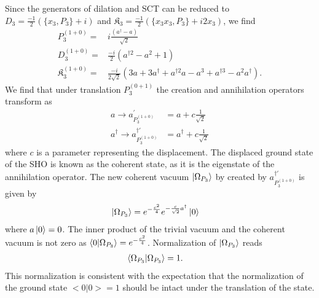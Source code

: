 \documentclass[%
 reprint,
superscriptaddress,
 amsmath,amssymb,
 aps,
]{revtex4-2}
\begin{document}
Since the generators of dilation and SCT can be reduced to $D_{3}=\frac{-1}{2}\left(\{x_{3}, P_{3}\}+i\right)$ and $\mathfrak{K}_{{3}}=\frac{-1}{2}\left(\{x_{3}x_{3}, P_{3}\}+i2x_{3}\right)$, we find
\begin{align}
    P^{(1+0)}_{3}=&i\frac{(a^{\dagger}-a)}{\sqrt{2}}\label{creation_anni_P}\\
    D^{(1+0)}_{3}=&\frac{-i}{2}\left(a^{\dagger 2} - a^2+1\right)\label{creation_anni_D}\\
    \mathfrak{K}^{(1+0)}_{{3}}=&\frac{-i}{2\sqrt{2}}\left(3a+3a^{\dagger}+  a^{\dagger 2}a - a^3 +  a^{\dagger 3} - a^2 a^{\dagger}\right)\label{creation_anni_KK}.
\end{align}
We find that under translation $P^{(0+1)}_{3}$ the creation and annihilation operators transform as
\begin{align}
    a \rightarrow a^{\prime}_{P^{(1+0)}_{3}}&=a +c \frac{1}{\sqrt{2}}\\
    a^{\dagger} \rightarrow a^{\dagger\prime}_{P^{(1+0)}_{3}}&=a^{\dagger} +c \frac{1}{\sqrt{2}}
\end{align}
where $c$ is a parameter representing the displacement. The displaced ground state of the SHO is known as the coherent state, as it is the eigenstate of the annihilation operator\cite{Glauber1963}. The new coherent vacuum $\ket{\Omega_{P_{3}}}$ by created by $a^{\dagger\prime}_{P^{(1+0)}_{3}}$ is given by
\begin{align}
    \ket{\Omega_{P_{3}}}&=e^{-\frac{c^2}{4}}e^{-\frac{c}{\sqrt{2}}a^{\dagger}}\ket{0}
\end{align}
where $a\ket{0}=0$. The inner product of the trivial vacuum and the coherent vacuum is not zero as $\braket{0|\Omega_{P_{3}}} = 
e^{-\frac{c^2}{4}}$. Normalization of $\ket{\Omega_{P_{3}}}$ reads 
\begin{align}
\braket{\Omega_{P_{3}}|\Omega_{P_{3}}} &=1.
\end{align}
This normalization is consistent with the expectation that the normalization of the ground state $<0|0> =1$ should be intact under the translation of the state. 
\end{document}
